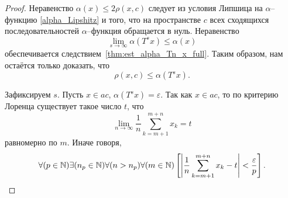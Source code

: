 \begin{proof}
	Неравенство $\alpha(x) \leq 2\rho(x, c)$ следует из
	условия Липшица на $\alpha$--функцию \eqref{alpha_Lipshitz}
	и того, что на пространстве $c$
	всех сходящихся последовательностей
	$\alpha$--функция обращается в нуль.
	Неравенство
	\begin{equation}
		\lim_{s\to\infty} \alpha(T^s x)
		\leq \alpha(x)
	\end{equation}
	обеспечивается следствием~\ref{thm:est_alpha_Tn_x_full}.
	Таким образом, нам остаётся только доказать, что
	\begin{equation}
		\rho(x,c)\leq \alpha(T^s x)
		.
	\end{equation}

	Зафиксируем $s$.
	Пусть $x\in ac$, $\alpha(T^s x)=\varepsilon$.
	Так как $x\in ac$, то по критерию Лоренца существует такое число $t$,
	что
	\begin{equation}
		\lim_{n\to\infty} \frac{1}{n} \sum_{k=m+1}^{m+n} x_k = t
	\end{equation}
	равномерно по $m$.
	Иначе говоря,
	\begin{equation}
		\forall(p\in\mathbb{N})
		\exists(n_p \in\mathbb{N})\forall(n>n_p)\forall(m\in\mathbb{N})
		\left[
			\left|
				\frac{1}{n}\sum_{k=m+1}^{m+n} x_k
				-t
			\right|
			<\frac{\varepsilon}{p}
		\right]
		.
	\end{equation}


\end{proof}
